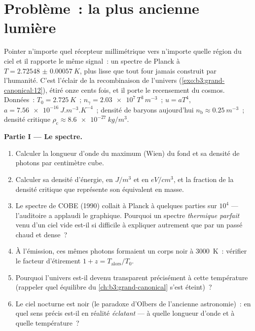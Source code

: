 \section{Problème~: la plus ancienne lumière}

\begin{problem}\label{pb:b3:photons-phonons:1}
Pointer n'importe quel récepteur millimétrique vers n'importe quelle
région du ciel et il rapporte le même signal~: un spectre de Planck
à $T =
\qty{2.72548(57)}{K}$, plus lisse que tout four jamais construit par
l'humanité. C'est l'éclair de la recombinaison de l'univers
(\cref{exo:b3:grand-canonical:12}), étiré onze cents fois, et il
porte le recensement du cosmos. Données~: $T_0 =
\qty{2.725}{K}$~; $n_\gamma = \num{2.03e7}\,T^3\,\unit{m^{-3}}$~;
$u = aT^4$, $a = \qty{7.56e-16}{J.m^{-3}.K^{-4}}$~; densité de
baryons aujourd'hui $n_{\text{b}} \approx \qty{0.25}{m^{-3}}$~;
densité critique $\rho_{\text{c}} \approx \qty{8.6e-27}{kg/m^3}$.

\medskip\noindent\textbf{Partie I --- Le spectre.}
\begin{enumerate}
  \item Calculer la longueur d'onde du maximum (Wien) du fond et sa
        densité de photons par centimètre cube.
  \item Calculer sa densité d'énergie, en $\unit{J/m^3}$ et en
        $\unit{eV/cm^3}$, et la fraction de la densité critique que
        représente son équivalent en masse.
  \item Le spectre de COBE (1990) collait à Planck à quelques
        parties sur $10^4$ --- l'auditoire a applaudi le graphique.
        Pourquoi un spectre \emph{thermique parfait} venu d'un ciel
        vide est-il si difficile à expliquer autrement que par un
        passé chaud et dense~?
  \item À l'émission, ces mêmes photons formaient un corps noir à
        \qty{3000}{K}~: vérifier le facteur d'étirement $1 + z =
        T_{\text{alors}}/T_0$.
  \item Pourquoi l'univers est-il devenu transparent précisément à
        cette température (rappeler quel équilibre du
        \cref{ch:b3:grand-canonical} s'est éteint)~?
  \item Le ciel nocturne est noir (le paradoxe d'Olbers de
        l'ancienne astronomie)~: en quel sens précis est-il en
        réalité \emph{éclatant} --- à quelle longueur d'onde et à
        quelle température~?
\end{enumerate}


\end{problem}
